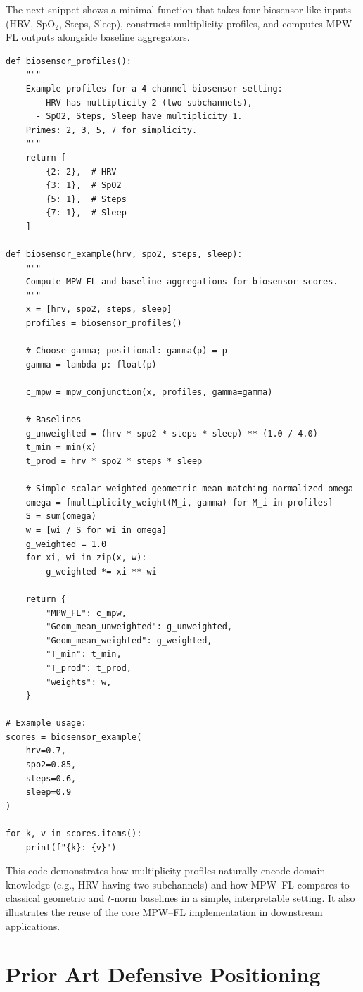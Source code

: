 \documentclass[11pt]{article}
\begin{document}
The next snippet shows a minimal function that takes four biosensor-like inputs (HRV, SpO$_2$, Steps, Sleep), constructs multiplicity profiles, and computes MPW--FL outputs alongside baseline aggregators.

\begin{verbatim}
def biosensor_profiles():
    """
    Example profiles for a 4-channel biosensor setting:
      - HRV has multiplicity 2 (two subchannels),
      - SpO2, Steps, Sleep have multiplicity 1.
    Primes: 2, 3, 5, 7 for simplicity.
    """
    return [
        {2: 2},  # HRV
        {3: 1},  # SpO2
        {5: 1},  # Steps
        {7: 1},  # Sleep
    ]

def biosensor_example(hrv, spo2, steps, sleep):
    """
    Compute MPW-FL and baseline aggregations for biosensor scores.
    """
    x = [hrv, spo2, steps, sleep]
    profiles = biosensor_profiles()

    # Choose gamma; positional: gamma(p) = p
    gamma = lambda p: float(p)

    c_mpw = mpw_conjunction(x, profiles, gamma=gamma)

    # Baselines
    g_unweighted = (hrv * spo2 * steps * sleep) ** (1.0 / 4.0)
    t_min = min(x)
    t_prod = hrv * spo2 * steps * sleep

    # Simple scalar-weighted geometric mean matching normalized omega
    omega = [multiplicity_weight(M_i, gamma) for M_i in profiles]
    S = sum(omega)
    w = [wi / S for wi in omega]
    g_weighted = 1.0
    for xi, wi in zip(x, w):
        g_weighted *= xi ** wi

    return {
        "MPW_FL": c_mpw,
        "Geom_mean_unweighted": g_unweighted,
        "Geom_mean_weighted": g_weighted,
        "T_min": t_min,
        "T_prod": t_prod,
        "weights": w,
    }

# Example usage:
scores = biosensor_example(
    hrv=0.7,
    spo2=0.85,
    steps=0.6,
    sleep=0.9
)

for k, v in scores.items():
    print(f"{k}: {v}")
\end{verbatim}

This code demonstrates how multiplicity profiles naturally encode domain knowledge (e.g., HRV having two subchannels) and how MPW--FL compares to classical geometric and $t$-norm baselines in a simple, interpretable setting. It also illustrates the reuse of the core MPW--FL implementation in downstream applications.

\section{Prior Art Defensive Positioning}
\label{sec:defensive-positioning}
\end{document}
